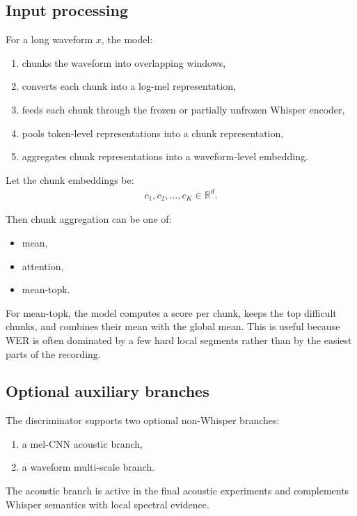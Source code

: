 \documentclass[11pt]{article}
\begin{document}
\subsection{Input processing}
For a long waveform $x$, the model:
\begin{enumerate}[leftmargin=*]
    \item chunks the waveform into overlapping windows,
    \item converts each chunk into a log-mel representation,
    \item feeds each chunk through the frozen or partially unfrozen Whisper encoder,
    \item pools token-level representations into a chunk representation,
    \item aggregates chunk representations into a waveform-level embedding.
\end{enumerate}

Let the chunk embeddings be:
\begin{align}
    c_1, c_2, \dots, c_K \in \mathbb{R}^{d}.
\end{align}

Then chunk aggregation can be one of:
\begin{itemize}[leftmargin=*]
    \item mean,
    \item attention,
    \item mean-topk.
\end{itemize}

For mean-topk, the model computes a score per chunk, keeps the top difficult chunks, and combines their mean with the global mean. This is useful because WER is often dominated by a few hard local segments rather than by the easiest parts of the recording.

\subsection{Optional auxiliary branches}
The discriminator supports two optional non-Whisper branches:
\begin{enumerate}[leftmargin=*]
    \item a mel-CNN acoustic branch,
    \item a waveform multi-scale branch.
\end{enumerate}

The acoustic branch is active in the final acoustic experiments and complements Whisper semantics with local spectral evidence.
\end{document}

